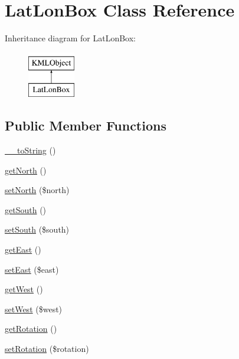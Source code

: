 \hypertarget{classLatLonBox}{
\section{LatLonBox Class Reference}
\label{d6/d2c/classLatLonBox}
}
Inheritance diagram for LatLonBox:\begin{figure}[H]
\begin{center}
\leavevmode
\includegraphics[height=2.000000cm]{d6/d2c/classLatLonBox}
\end{center}
\end{figure}
\subsection*{Public Member Functions}
\begin{DoxyCompactItemize}
\item 
\hyperlink{classLatLonBox_a8767b5979f3abb6e0988f007cd79163a}{\_\-\_\-toString} ()
\item 
\hyperlink{classLatLonBox_a5eddadeaf2073ec77b11eb28bd3354f7}{getNorth} ()
\item 
\hyperlink{classLatLonBox_a14aa2c166df87c6a09651f60eec77ea7}{setNorth} (\$north)
\item 
\hyperlink{classLatLonBox_ab77ca24af0563f983e564ef1a059344f}{getSouth} ()
\item 
\hyperlink{classLatLonBox_a3afc27334949ff4045f297e1f92f0bc1}{setSouth} (\$south)
\item 
\hyperlink{classLatLonBox_a42c137e8b129f0b1cce658c40cd51aa0}{getEast} ()
\item 
\hyperlink{classLatLonBox_a3c329b23e56678a20df1b5fe47fb8369}{setEast} (\$east)
\item 
\hyperlink{classLatLonBox_a695828ec7d4de0e8b469f2d93362c40b}{getWest} ()
\item 
\hyperlink{classLatLonBox_a78900e389f42c27a2dcbe0d3869704db}{setWest} (\$west)
\item 
\hyperlink{classLatLonBox_a8c8b2c193a6f48379f0c06b590a6fe13}{getRotation} ()
\item 
\hyperlink{classLatLonBox_ab952507d2480bbce1d7a8b50d8839b1a}{setRotation} (\$rotation)
\end{DoxyCompactItemize}


